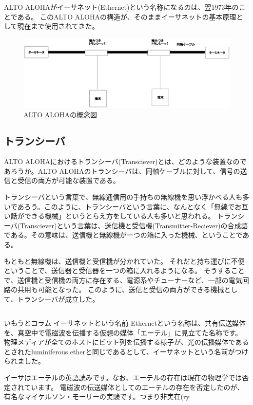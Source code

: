 ALTO ALOHAがイーサネット(Ethernet)という名称になるのは、翌1973年のことである。
このALTO ALOHAの構造が、そのままイーサネットの基本原理として現在まで使用されてきた。

\begin{figure}[htbp]
	\includegraphics[width=12cm,clip]{draw/altoaloha.eps}
	\caption{ALTO ALOHAの概念図}
	\label{fig:altoaloha}
\end{figure}

\subsection{トランシーバ}

ALTO ALOHAにおけるトランシーバ(Transciever)とは、どのような装置なのであろうか。ALTO ALOHAのトランシーバは、同軸ケーブルに対して、信号の送信と受信の両方が可能な装置である。

トランシーバという言葉で、無線通信用の手持ちの無線機を思い浮かべる人も多いであろう。このように、トランシーバという言葉に、なんとなく「無線でお互い話ができる機械」というとらえ方をしている人も多いと思われる。
トランシーバ(Transciever)という言葉は、送信機と受信機(Transmitter-Reciever)の合成語である。その意味は、送信機と無線機が一つの箱に入った機械、ということである。

もともと無線機は、送信機と受信機が分かれていた。
それだと持ち運びに不便ということで、送信器と受信器を一つの箱に入れるようになる。
そうすることで、送信機と受信機の両方に存在する、電源系やチューナーなど、一部の電気回路の共用も可能となった。
このように、送信と受信の両方ができる機械として、トランシーバが成立した。

\subsection*{}
\begin{itembox}[l]{いもうとコラム イーサネットという名前}
Ethernetという名称は、共有伝送媒体を、真空中で電磁波を伝播する仮想の媒体「エーテル」に見立てた名称です。
物理メディアが全てのホストにビット列を伝播する様子が、光の伝播媒体であるとされたluminiferous etherと同じであるとして、イーサネットという名前がつけられました。

イーサはエーテルの英語読みです。なお、エーテルの存在は現在の物理学では否定されています。
電磁波の伝送媒体としてのエーテルの存在を否定したのが、有名なマイケルソン・モーリーの実験です。つまり非実在(ry
\end{itembox}

